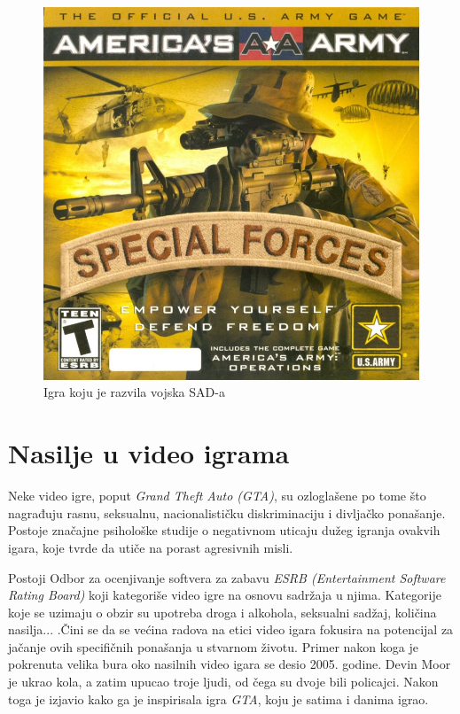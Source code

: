 \documentclass[a4paper]{article}
\begin{document}
\begin{figure}[h!]
	\begin{center}
		\includegraphics[scale=1]{americasarmy.jpg}
	\end{center}
	\caption{Igra koju je razvila vojska SAD-a}
\end{figure}

\newpage

\section{Nasilje u video igrama}
\label{sec:nasilje}
Neke video igre, poput {\em Grand Theft Auto (GTA)}, su ozloglašene po tome što 
nagrađuju rasnu, seksualnu, nacionalističku diskriminaciju i divljačko ponašanje. Postoje 
značajne psihološke studije o negativnom uticaju dužeg igranja ovakvih igara, koje tvrde da utiče na porast
agresivnih misli. 

Postoji Odbor za ocenjivanje softvera za zabavu {\em ESRB (Entertainment Software Rating Board)} koji kategoriše
video igre na osnovu sadržaja u njima. Kategorije koje se uzimaju o obzir su upotreba droga i alkohola, seksualni sadžaj,
količina nasilja... .Čini se da se većina radova na etici video igara fokusira na potencijal za
jačanje ovih specifičnih ponašanja u stvarnom životu. Primer nakon koga je pokrenuta velika bura oko nasilnih video igara
se desio 2005. godine. Devin Moor je ukrao kola, a zatim upucao troje ljudi, od čega su dvoje bili policajci.
Nakon toga je izjavio kako ga je inspirisala igra {\em GTA}, koju je satima i danima igrao.\cite{cbs_devim_moor}
\end{document}
